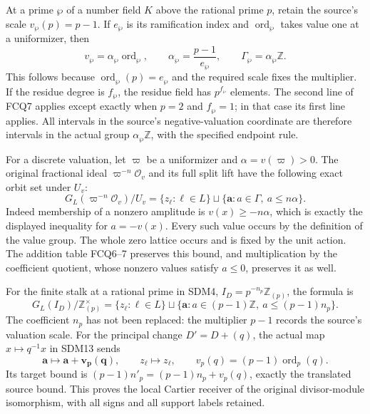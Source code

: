 At a prime $\wp$ of a number field $K$ above the rational
prime $p$, retain the source's scale
$v_\wp(p)=p-1$. If $e_\wp$ is its ramification index and
$\operatorname{ord}_\wp$ takes value one at a uniformizer,
then
\begin{equation}\tag{FCQ14}
v_\wp=\alpha_\wp\operatorname{ord}_\wp,\qquad
\alpha_\wp=\frac{p-1}{e_\wp},\qquad
\Gamma_\wp=\alpha_\wp\mathbb Z.
\end{equation}
This follows because
$\operatorname{ord}_\wp(p)=e_\wp$ and the required scale
fixes the multiplier. If the residue degree is $f_\wp$,
the residue field has $p^{f_\wp}$ elements. The second
line of FCQ7 applies except exactly when
$p=2$ and $f_\wp=1$; in that case its first line applies.
All intervals in the source's negative-valuation coordinate
are therefore intervals in the actual group
$\alpha_\wp\mathbb Z$, with the specified endpoint rule.

For a discrete valuation, let $\varpi$ be a uniformizer
and $\alpha=v(\varpi)>0$. The original fractional ideal
$\varpi^{-n}\mathcal O_v$ and its full split lift have
the following exact orbit set under $U_v$:
\begin{equation}\tag{FCQ15}
G_L(\varpi^{-n}\mathcal O_v)/U_v
 =\{z_\ell:\ell\in L\}
      \sqcup\{\mathbf a:a\in\Gamma,\ a\le n\alpha\}.
\end{equation}
Indeed membership of a nonzero amplitude is
$v(x)\ge-n\alpha$, which is exactly the displayed
inequality for $a=-v(x)$. Every such value occurs by
the definition of the value group. The whole zero lattice
occurs and is fixed by the unit action. The addition table
FCQ6--7 preserves this bound, and multiplication by the
coefficient quotient, whose nonzero values satisfy $a\le0$,
preserves it as well.

For the finite stalk at a rational prime in SDM4,
$I_D=p^{-n_p}\mathbb Z_{(p)}$, the formula is
\begin{equation}\tag{FCQ16}
G_L(I_D)/\mathbb Z_{(p)}^\times
 =\{z_\ell:\ell\in L\}
   \sqcup\{\mathbf a:a\in(p-1)\mathbb Z,\
                              a\le(p-1)n_p\}.
\end{equation}
The coefficient $n_p$ has not been replaced: the multiplier
$p-1$ records the source's valuation scale.
For the principal change $D'=D+(q)$, the actual map
$x\mapsto q^{-1}x$ in SDM13 sends
\[
\mathbf a\longmapsto\mathbf{a+v_p(q)},\qquad
z_\ell\longmapsto z_\ell,
\qquad v_p(q)=(p-1)\operatorname{ord}_p(q).
\]
Its target bound is
$(p-1)n'_p=(p-1)n_p+v_p(q)$, exactly the translated
source bound. This proves the local Cartier receiver of
the original divisor-module isomorphism, with all signs
and all support labels retained.

